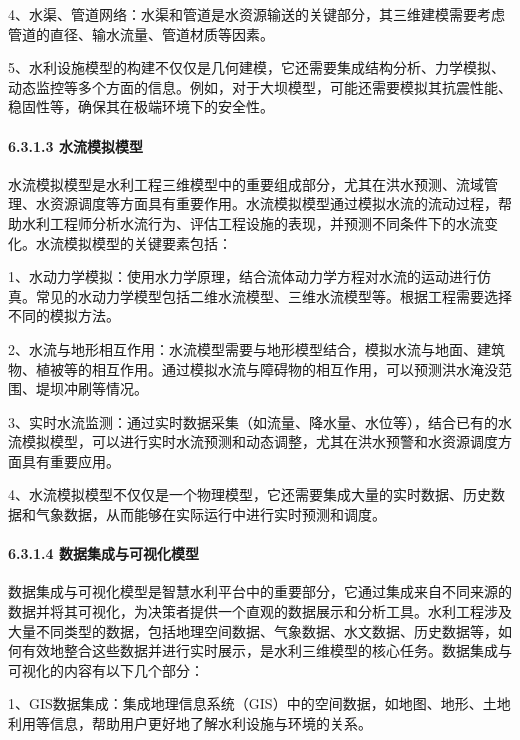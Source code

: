 4、水渠、管道网络：水渠和管道是水资源输送的关键部分，其三维建模需要考虑管道的直径、输水流量、管道材质等因素。

5、水利设施模型的构建不仅仅是几何建模，它还需要集成结构分析、力学模拟、动态监控等多个方面的信息。例如，对于大坝模型，可能还需要模拟其抗震性能、稳固性等，确保其在极端环境下的安全性。

\hypertarget{ux6c34ux6d41ux6a21ux62dfux6a21ux578b}{%
\paragraph{6.3.1.3 水流模拟模型}\label{ux6c34ux6d41ux6a21ux62dfux6a21ux578b}}

水流模拟模型是水利工程三维模型中的重要组成部分，尤其在洪水预测、流域管理、水资源调度等方面具有重要作用。水流模拟模型通过模拟水流的流动过程，帮助水利工程师分析水流行为、评估工程设施的表现，并预测不同条件下的水流变化。水流模拟模型的关键要素包括：

1、水动力学模拟：使用水力学原理，结合流体动力学方程对水流的运动进行仿真。常见的水动力学模型包括二维水流模型、三维水流模型等。根据工程需要选择不同的模拟方法。

2、水流与地形相互作用：水流模型需要与地形模型结合，模拟水流与地面、建筑物、植被等的相互作用。通过模拟水流与障碍物的相互作用，可以预测洪水淹没范围、堤坝冲刷等情况。

3、实时水流监测：通过实时数据采集（如流量、降水量、水位等），结合已有的水流模拟模型，可以进行实时水流预测和动态调整，尤其在洪水预警和水资源调度方面具有重要应用。

4、水流模拟模型不仅仅是一个物理模型，它还需要集成大量的实时数据、历史数据和气象数据，从而能够在实际运行中进行实时预测和调度。

\hypertarget{ux6570ux636eux96c6ux6210ux4e0eux53efux89c6ux5316ux6a21ux578b}{%
\paragraph{6.3.1.4 数据集成与可视化模型}\label{ux6570ux636eux96c6ux6210ux4e0eux53efux89c6ux5316ux6a21ux578b}}

数据集成与可视化模型是智慧水利平台中的重要部分，它通过集成来自不同来源的数据并将其可视化，为决策者提供一个直观的数据展示和分析工具。水利工程涉及大量不同类型的数据，包括地理空间数据、气象数据、水文数据、历史数据等，如何有效地整合这些数据并进行实时展示，是水利三维模型的核心任务。数据集成与可视化的内容有以下几个部分：

1、GIS数据集成：集成地理信息系统（GIS）中的空间数据，如地图、地形、土地利用等信息，帮助用户更好地了解水利设施与环境的关系。

